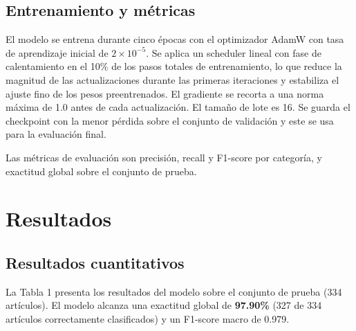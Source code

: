 \documentclass[letterpaper, 10 pt, conference]{latex_template/ieeeconf}
\begin{document}
\subsection{Entrenamiento y métricas}

El modelo se entrena durante cinco épocas con el optimizador AdamW con tasa de aprendizaje inicial de $2 \times 10^{-5}$. Se aplica un scheduler lineal con fase de calentamiento en el 10\% de los pasos totales de entrenamiento, lo que reduce la magnitud de las actualizaciones durante las primeras iteraciones y estabiliza el ajuste fino de los pesos preentrenados. El gradiente se recorta a una norma máxima de 1.0 antes de cada actualización. El tamaño de lote es 16. Se guarda el checkpoint con la menor pérdida sobre el conjunto de validación y este se usa para la evaluación final.

Las métricas de evaluación son precisión, recall y F1-score por categoría, y exactitud global sobre el conjunto de prueba.

\section{Resultados}

\subsection{Resultados cuantitativos}

La Tabla 1 presenta los resultados del modelo sobre el conjunto de prueba (334 artículos). El modelo alcanza una exactitud global de \textbf{97.90\%} (327 de 334 artículos correctamente clasificados) y un F1-score macro de 0.979.

\begin{table}[h]
\centering
\caption{Precisión, recall y F1-score por categoría en el conjunto de prueba (334 artículos).}
\end{table}
\end{document}
